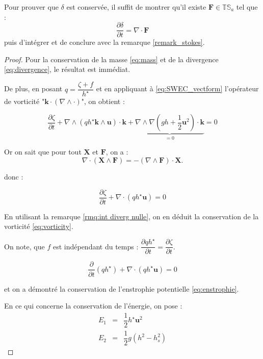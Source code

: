 \begin{remarque}
Pour prouver que $\delta$ est conservée, il suffit de montrer qu'il existe $\mathbf{F} \in \mathbb{T} \mathbb{S}_a$ tel que :
$$
\dfrac{\partial \delta}{\partial t} = \nabla \cdot \mathbf{F}
$$
puis d'intégrer et de conclure avec la remarque \ref{remark_stokes}.
\label{rmq:int diverg nulle}
\end{remarque}

\begin{proof}
Pour la conservation de la masse \eqref{eq:mass} et de la divergence \eqref{eq:divergence}, le résultat est immédiat.

De plus, en posant $q = \dfrac{\zeta+f}{h^{\star}}$ et en appliquant à \eqref{eq:SWEC_vectform} l'opérateur de vorticité "$\mathbf{k} \cdot \left( \nabla \wedge \cdot \right)$", on obtient :

$$
\dfrac{\partial \zeta}{\partial t}+\nabla \wedge \left( q h^{\star} \mathbf{k} \wedge \mathbf{u} \right) \cdot\mathbf{k} + \underbrace{\nabla \wedge \nabla \left( gh + \dfrac{1}{2}\mathbf{u}^2 \right) \cdot \mathbf{k}}_{=0} = 0 
$$

Or on sait que pour tout $\mathbf{X}$ et $\mathbf{F}$, on a :
\begin{equation}
\nabla \cdot \left( \mathbf{X} \wedge \mathbf{F} \right) = - \left( \nabla \wedge \mathbf{F} \right) \cdot \mathbf{X}.
\end{equation}

donc :

$$
\dfrac{ \partial \zeta}{\partial t} + \nabla \cdot \left( q h^{\star} \mathbf{u} \right) = 0
$$

En utilisant la remarque \ref{rmq:int diverg nulle}, on en déduit la conservation de la vorticité \eqref{eq:vorticity}.

On note, que $f$ est indépendant du temps : $\dfrac{\partial q h^{\star}}{\partial t
} = \dfrac{\partial \zeta}{\partial t}$.

$$
\dfrac{\partial}{\partial t} \left( q h^{\star} \right) + \nabla \cdot \left( q h^{\star} \mathbf{u} \right) = 0
$$

et on a démontré la conservation de l'enstrophie potentielle \eqref{eq:enstrophie}.

En ce qui concerne la conservation de l'énergie, on pose :
\begin{equation}
\begin{array}{rcl}
E_1 & = & \dfrac{1}{2} h^{\star} \mathbf{u}^2 \\
E_2 & = & \dfrac{1}{2} g \left( h^2 - h_s^2 \right)
\end{array}
\end{equation}


\end{proof}
